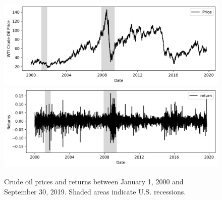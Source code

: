 \documentclass[12pt]{article}
\begin{document}
	\begin{figure}[H]
		\centering
		\includegraphics[width=\linewidth]{figures/wti_summary/prices.png}
		\includegraphics[width=\linewidth]{figures/wti_summary/returns.png}
		\caption{Crude oil prices and returns between January 1, 2000 and September 30, 2019. Shaded areas indicate U.S. recessions.}
	\end{figure}
\end{document}
